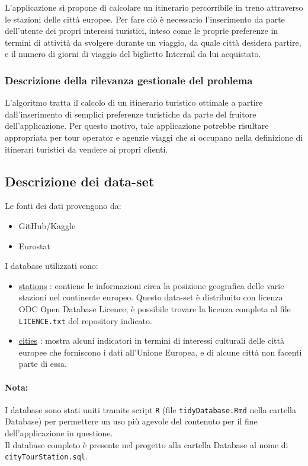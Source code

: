 \documentclass[12pt, a4paper]{article}
\begin{document}
	L'applicazione si propone di calcolare un itinerario percorribile in treno attraverso le stazioni delle città europee. Per fare ciò è necessario l'inserimento da parte dell'utente dei propri interessi turistici, inteso come le proprie preferenze in termini di attività da svolgere durante un viaggio, da quale città desidera partire, e il numero di giorni di viaggio del biglietto Interrail da lui acquistato. 
	
	\subsubsection{ Descrizione della rilevanza gestionale del problema}
	
	L'algoritmo tratta il calcolo di un itinerario turistico ottimale a partire dall'inserimento di semplici preferenze turistiche da parte del fruitore dell'applicazione. Per questo motivo, tale applicazione potrebbe risultare appropriata per tour operator e agenzie viaggi che si occupano nella definizione di itinerari turistici da vendere ai propri clienti.
	
	\subsection{ Descrizione dei data-set} \label{dbs}
	
	Le fonti dei dati provengono da:
	\begin{itemize}
		\item GitHub/Kaggle
		\item Eurostat
	\end{itemize}	
	I database utilizzati sono:
	\begin{itemize}
		\item  \href{https://github.com/trainline-eu/stations}{stations} : contiene le informazioni circa la posizione geografica delle varie stazioni nel continente europeo. Questo data-set è distribuito con licenza ODC Open Database Licence; è possibile trovare la licenza completa al file \verb*|LICENCE.txt| del repository indicato.
		\item \href{https://ec.europa.eu/eurostat/databrowser/view/urb_ctour/default/table?lang=en}{cities} : mostra alcuni indicatori in termini di interessi culturali delle città europee che forniscono i dati all'Unione Europea, e di alcune città non facenti parte di essa.
	\end{itemize}
	
	\paragraph{Nota: \\}I database sono stati uniti tramite script \verb*|R| (file \verb*|tidyDatabase.Rmd| nella cartella Database) per permettere un uso più agevole del contenuto per il fine dell'applicazione in questione. \\Il database completo è presente nel progetto alla cartella Database al nome di  \verb*|cityTourStation.sql|.
	
\end{document}

